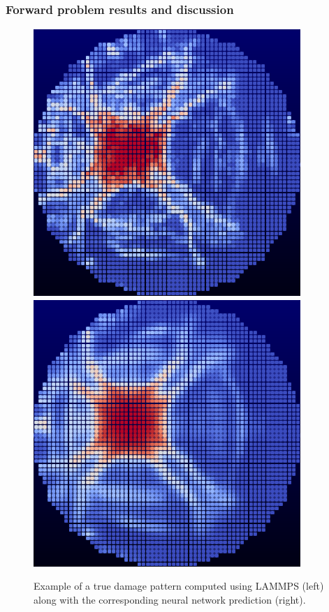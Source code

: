 \subsubsection{Forward problem results and discussion}
\label{forward_results}

\begin{figure}
  \centering
  \includegraphics[scale=1.1]{soln_19050.eps}
  \includegraphics[scale=1.1]{pred_19050.eps}
\caption{Example of a true damage pattern computed using LAMMPS (left) along with the corresponding neural network prediction (right).}
\label{fig:forward_results}       
\end{figure}


